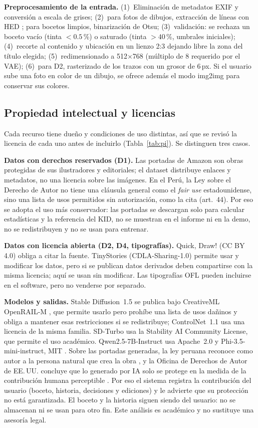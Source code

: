 \documentclass[10pt,a4paper,twocolumn]{article}
\begin{document}
\textbf{Preprocesamiento de la entrada.}
(1)~Eliminación de metadatos EXIF y conversión a escala de grises;
(2)~para fotos de dibujos, extracción de líneas con HED \citep{xie2015}; para bocetos limpios, binarización de Otsu;
(3)~validación: se rechaza un boceto vacío (tinta $<0.5$\,\%) o saturado (tinta $>40$\,\%, umbrales iniciales);
(4)~recorte al contenido y ubicación en un lienzo 2:3 dejando libre la zona del título elegida;
(5)~redimensionado a 512$\times$768 (múltiplo de 8 requerido por el VAE);
(6)~para D2, rasterizado de los trazos con un grosor de 6\,px.
Si el usuario sube una foto en color de un dibujo, se ofrece además el modo img2img \citep{meng2021} para conservar sus colores.

\subsection{Propiedad intelectual y licencias}\label{sec:pi}
Cada recurso tiene dueño y condiciones de uso distintas, así que se revisó la licencia de cada uno antes de incluirlo (Tabla~\ref{tab:pi}). Se distinguen tres casos.

\textbf{Datos con derechos reservados (D1).} Las portadas de Amazon son obras protegidas de sus ilustradores y editoriales; el dataset distribuye enlaces y metadatos, no una licencia sobre las imágenes. En el Perú, la Ley sobre el Derecho de Autor \citep{dl822} no tiene una cláusula general como el \emph{fair use} estadounidense, sino una lista de usos permitidos sin autorización, como la cita (art.~44). Por eso se adopta el uso más conservador: las portadas se descargan solo para calcular estadísticas y la referencia del KID, no se muestran en el informe ni en la demo, no se redistribuyen y no se usan para entrenar.

\textbf{Datos con licencia abierta (D2, D4, tipografías).} Quick, Draw! (CC BY 4.0) \citep{ccby4} obliga a citar la fuente. TinyStories (CDLA-Sharing-1.0) \citep{cdla} permite usar y modificar los datos, pero si se publican datos derivados deben compartirse con la misma licencia; aquí se usan sin modificar. Las tipografías OFL pueden incluirse en el software, pero no venderse por separado.

\textbf{Modelos y salidas.} Stable Diffusion~1.5 se publica bajo CreativeML OpenRAIL-M \citep{openrail}, que permite usarlo pero prohíbe una lista de usos dañinos y obliga a mantener esas restricciones si se redistribuye; ControlNet~1.1 usa una licencia de la misma familia. SD-Turbo usa la Stability AI Community License, que permite el uso académico. Qwen2.5-7B-Instruct usa Apache~2.0 \citep{qwen2024} y Phi-3.5-mini-instruct, MIT \citep{abdin2024}. Sobre las portadas generadas, la ley peruana reconoce como autor a la persona natural que crea la obra \citep{dl822}, y la Oficina de Derechos de Autor de EE.\,UU. concluye que lo generado por IA solo se protege en la medida de la contribución humana perceptible \citep{usco2025}. Por eso el sistema registra la contribución del usuario (boceto, historia, decisiones y ediciones) y le advierte que su protección no está garantizada. El boceto y la historia siguen siendo del usuario: no se almacenan ni se usan para otro fin. Este análisis es académico y no sustituye una asesoría legal.
\end{document}
